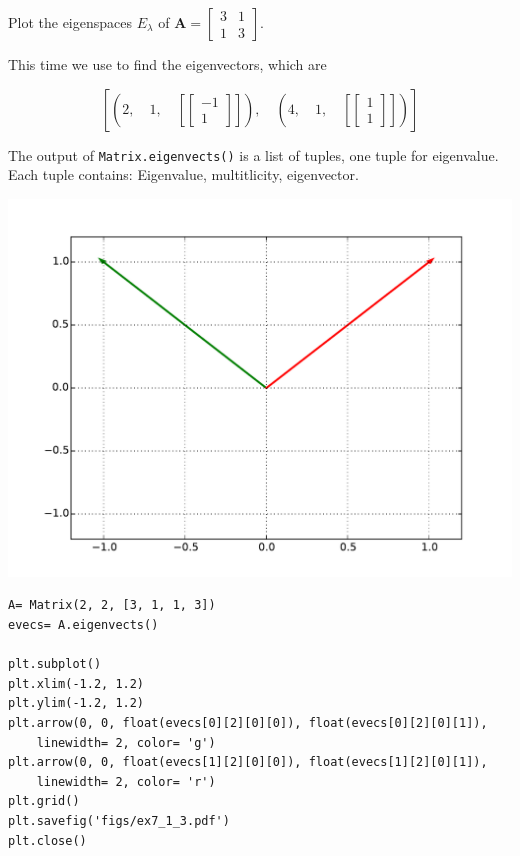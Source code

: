 Plot the eigenspaces $E_\lambda$ of $\mathbf{A}= \left[\begin{matrix}3 & 1\\1 & 3\end{matrix}\right]$.

This time we use \sympy to find the eigenvectors, which are

$$
\left [ \left ( 2, \quad 1, \quad \left [ \left[\begin{matrix}-1\\1\end{matrix}\right]\right ]\right ),
\quad \left ( 4, \quad 1, \quad \left [ \left[\begin{matrix}1\\1\end{matrix}\right]\right ]\right )\right ]
$$

The output of \sympy \texttt{Matrix.eigenvects()} is a list of tuples, one tuple for eigenvalue. Each
tuple contains: Eigenvalue, multitlicity, eigenvector.

\includegraphics[width=\linewidth]{figs/ex7_1_3.pdf}

\begin{verbatim}
A= Matrix(2, 2, [3, 1, 1, 3])
evecs= A.eigenvects()

plt.subplot()
plt.xlim(-1.2, 1.2)
plt.ylim(-1.2, 1.2)
plt.arrow(0, 0, float(evecs[0][2][0][0]), float(evecs[0][2][0][1]),
    linewidth= 2, color= 'g')
plt.arrow(0, 0, float(evecs[1][2][0][0]), float(evecs[1][2][0][1]),
    linewidth= 2, color= 'r')
plt.grid()
plt.savefig('figs/ex7_1_3.pdf')
plt.close()
\end{verbatim}

